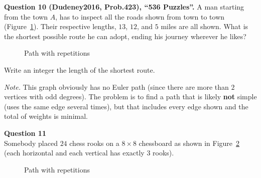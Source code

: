 \documentclass[jou]{apa6}
\begin{document}
\vspace{10pt}
{\bf Question 10 (Dudeney2016, Prob.423), ``536 Puzzles''.}
A man starting from the town $A$, has to inspect all the roads
shown from town to town (Figure~\ref{fig:path-with-repetitions}). 
Their respective lengths, $13$, $12$, and $5$
miles are all shown. What is the shortest possible route he can adopt, 
ending his journey wherever he likes?

\begin{figure}[!htb]
\caption{\label{fig:path-with-repetitions} Path with repetitions}
\end{figure}

Write an integer \textendash{} the length of the shortest route.

{\em Note.} This graph obviously has no Euler path (since there
are more than $2$ vertices with odd degrees). The problem is to 
find a path that is likely {\bf not} simple 
(uses the same edge several times), 
but that includes every edge shown and the total of weights is minimal. 





\vspace{10pt}
{\bf Question 11}\\
Somebody placed $24$ chess rooks on a $8 \times 8$ chessboard as shown in Figure~\ref{fig:rooks}
(each horizontal and each vertical has exactly $3$ rooks). 


\begin{figure}[!htb]
\caption{\label{fig:rooks} Path with repetitions}
\end{figure}
\end{document}
